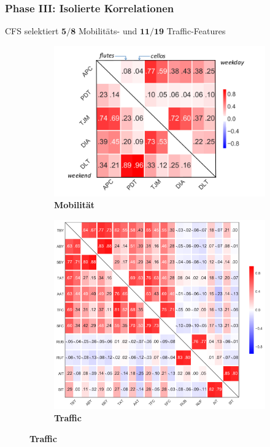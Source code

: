 \documentclass{beamer}
\begin{document}
\begin{frame}
  \frametitle{Phase III: Isolierte Korrelationen}
  \textsc{CFS} selektiert $\boldsymbol{5 / 8}$ Mobilitäts- und $\boldsymbol{11 / 19}$ Traffic-Features

  \begin{figure}[H]
    \centering
    \hspace{-3cm}
    \begin{subfigure}[b]{0.45\textwidth}
      \includegraphics[width=1.175\textwidth]{images/mobility_correlations.png}
      \caption*{\textbf{\quad\quad\quad Mobilität} \cite{Alipour2018}}
    \end{subfigure}
    \hspace{3px}
    \begin{subfigure}[b]{0.45\textwidth}
      \includegraphics[width=1.5\textwidth]{images/traffic_correlations.png}  
      \caption*{\textbf{\quad\quad\quad\quad\quad Traffic} \cite{Alipour2018}}
    \end{subfigure}    
  \end{figure}  
\end{frame}
\end{document}
